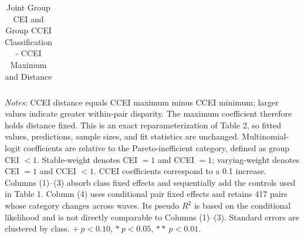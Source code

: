 \documentclass[11pt]{article}
\begin{document}
\clearpage

\begin{table}[H]
\centering
\caption{Joint Group CEI and Group CCEI Classification - CCEI Maximum and Distance}
\label{tab:cei-ccei-joint-dist}
\begin{threeparttable}
\footnotesize
\renewcommand{\arraystretch}{0.95}
\setlength{\tabcolsep}{9pt}
\begin{tabular}{lcccc}
\toprule

\end{tabular}
\begin{tablenotes}[flushleft]
\scriptsize
\item \textit{Notes:} CCEI distance equals CCEI maximum minus CCEI minimum; larger values indicate greater within-pair disparity. The maximum coefficient therefore holds distance fixed. This is an exact reparameterization of Table 2, so fitted values, predictions, sample sizes, and fit statistics are unchanged. Multinomial-logit coefficients are relative to the Pareto-inefficient category, defined as group CEI $<1$. Stable-weight denotes CEI $=1$ and CCEI $=1$; varying-weight denotes CEI $=1$ and CCEI $<1$. CCEI coefficients correspond to a 0.1 increase. Columns (1)--(3) absorb class fixed effects and sequentially add the controls used in Table 1. Column (4) uses conditional pair fixed effects and retains 417 pairs whose category changes across waves. Its pseudo $R^2$ is based on the conditional likelihood and is not directly comparable to Columns (1)--(3). Standard errors are clustered by class. $+\ p<0.10$, $*\ p<0.05$, $**\ p<0.01$.
\end{tablenotes}
\end{threeparttable}
\end{table}
\end{document}

